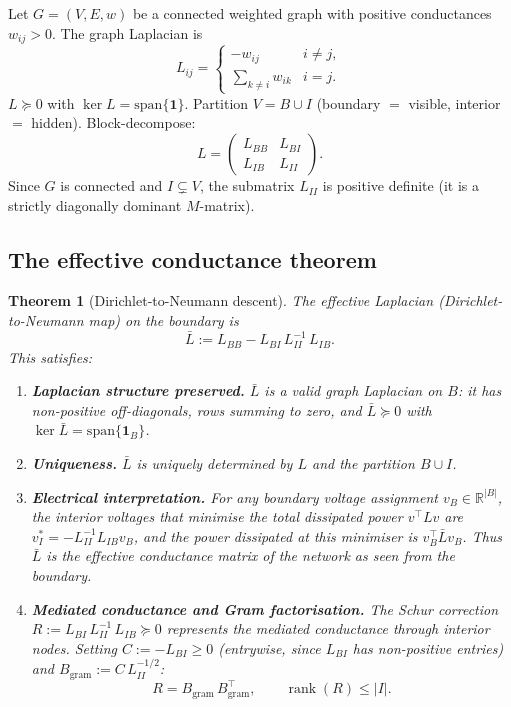 \documentclass[11pt,a4paper]{article}
\numberwithin{equation}{section}
\DeclareMathOperator{\rank}{rank}
\newcommand{\R}{\mathbb{R}}
\theoremstyle{thmcompact}
\newtheorem{theorem}{Theorem}[section]
\theoremstyle{remark}
\begin{document}
Let $G = (V, E, w)$ be a connected weighted graph with positive conductances $w_{ij} > 0$. The graph Laplacian is
\begin{equation}\label{eq:F-laplacian}
L_{ij} = \begin{cases} -w_{ij} & i \neq j, \\ \sum_{k \neq i} w_{ik} & i = j. \end{cases}
\end{equation}
$L \succeq 0$ with $\ker L = \mathrm{span}\{\mathbf{1}\}$. Partition $V = B \cup I$ (boundary $=$ visible, interior $=$ hidden). Block-decompose:
\begin{equation}\label{eq:F-blocks}
L = \begin{pmatrix} L_{BB} & L_{BI} \\ L_{IB} & L_{II} \end{pmatrix}.
\end{equation}
Since $G$ is connected and $I \subsetneq V$, the submatrix $L_{II}$ is positive definite (it is a strictly diagonally dominant $M$-matrix).

\subsection{The effective conductance theorem}

\begin{theorem}[Dirichlet-to-Neumann descent]\label{thm:bridge-F}
The \emph{effective Laplacian} (Dirichlet-to-Neumann map) on the boundary is
\begin{equation}\label{eq:F-effective}
\bar{L} := L_{BB} - L_{BI}\,L_{II}^{-1}\,L_{IB}.
\end{equation}
This satisfies:
\begin{enumerate}[label=\textup{(\roman*)}]
\item \textbf{Laplacian structure preserved.} $\bar{L}$ is a valid graph Laplacian on $B$: it has non-positive off-diagonals, rows summing to zero, and $\bar{L} \succeq 0$ with $\ker \bar{L} = \mathrm{span}\{\mathbf{1}_B\}$.
\item \textbf{Uniqueness.} $\bar{L}$ is uniquely determined by $L$ and the partition $B \cup I$.
\item \textbf{Electrical interpretation.} For any boundary voltage assignment $v_B \in \R^{|B|}$, the interior voltages that minimise the total dissipated power $v^\top L v$ are $v_I^* = -L_{II}^{-1}L_{IB}v_B$, and the power dissipated at this minimiser is $v_B^\top \bar{L} v_B$. Thus $\bar{L}$ is the effective conductance matrix of the network as seen from the boundary.
\item \textbf{Mediated conductance and Gram factorisation.} The Schur correction $R := L_{BI}\,L_{II}^{-1}\,L_{IB} \succeq 0$ represents the mediated conductance through interior nodes. Setting $C := -L_{BI} \geq 0$ (entrywise, since $L_{BI}$ has non-positive entries) and $B_{\mathrm{gram}} := C\,L_{II}^{-1/2}$:
\begin{equation}\label{eq:F-gram}
R = B_{\mathrm{gram}}\,B_{\mathrm{gram}}^\top, \qquad \rank(R) \leq |I|.
\end{equation}
\end{enumerate}
\end{theorem}
\end{document}
